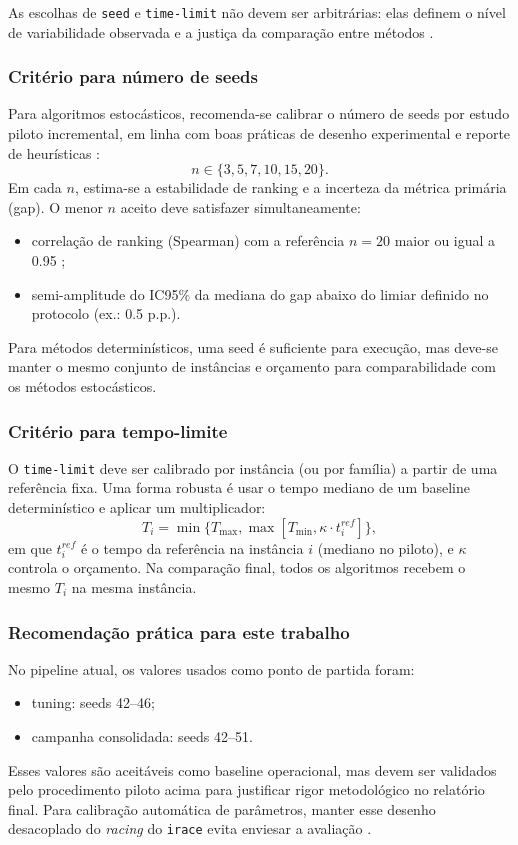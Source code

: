 As escolhas de \texttt{seed} e \texttt{time-limit} não devem ser arbitrárias: elas definem o nível de variabilidade observada e a justiça da comparação entre métodos \cite{barr1995experiments,hooker1995testing}.

\subsubsection{Critério para número de seeds}

Para algoritmos estocásticos, recomenda-se calibrar o número de seeds por estudo piloto incremental, em linha com boas práticas de desenho experimental e reporte de heurísticas \cite{barr1995experiments,hooker1995testing}:
\[
n \in \{3,5,7,10,15,20\}.
\]
Em cada $n$, estima-se a estabilidade de ranking e a incerteza da métrica primária (gap). O menor $n$ aceito deve satisfazer simultaneamente:
\begin{itemize}
  \item correlação de ranking (Spearman) com a referência $n=20$ maior ou igual a 0.95 \cite{demsar2006statistical};
  \item semi-amplitude do IC95\% da mediana do gap abaixo do limiar definido no protocolo (ex.: 0.5 p.p.).
\end{itemize}

Para métodos determinísticos, uma seed é suficiente para execução, mas deve-se manter o mesmo conjunto de instâncias e orçamento para comparabilidade com os métodos estocásticos.

\subsubsection{Critério para tempo-limite}

O \texttt{time-limit} deve ser calibrado por instância (ou por família) a partir de uma referência fixa.
Uma forma robusta é usar o tempo mediano de um baseline determinístico e aplicar um multiplicador:
\[
T_i = \min\{T_{\max},\max[T_{\min},\kappa\cdot t^{ref}_i]\},
\]
em que $t^{ref}_i$ é o tempo da referência na instância $i$ (mediano no piloto), e $\kappa$ controla o orçamento.
Na comparação final, todos os algoritmos recebem o mesmo $T_i$ na mesma instância.

\subsubsection{Recomendação prática para este trabalho}

No pipeline atual, os valores usados como ponto de partida foram:
\begin{itemize}
  \item tuning: seeds 42--46;
  \item campanha consolidada: seeds 42--51.
\end{itemize}
Esses valores são aceitáveis como baseline operacional, mas devem ser validados pelo procedimento piloto acima para justificar rigor metodológico no relatório final.
Para calibração automática de parâmetros, manter esse desenho desacoplado do \emph{racing} do \texttt{irace} evita enviesar a avaliação \cite{lopez2016irace}.

